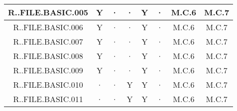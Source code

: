 \begin{table}[htbp]
\begin{tabular}{|c|c|c|c|c|c||c|c|}
    R..FILE.BASIC.005 & Y  &·  & · &Y  &· &M.C.6 & M.C.7\\
    \hline
    R..FILE.BASIC.006 & Y  &·  & · & Y  &· &M.C.6 & M.C.7\\ 
    \hline
    R..FILE.BASIC.007 & Y  &·  & · & Y  &· &M.C.6 & M.C.7\\
    \hline
    R..FILE.BASIC.008 & Y  &·  & · & Y  &· &M.C.6 & M.C.7\\
    \hline
    R..FILE.BASIC.009 & Y  &·  & · & Y  &· &M.C.6 & M.C.7\\ 
    \hline
    R..FILE.BASIC.010 &·  & · & Y & Y  &· &M.C.6 & M.C.7\\ 
    \hline
    R..FILE.BASIC.011 &·  & · & Y & Y  &· &M.C.6 & M.C.7\\ 
    \hline
\end{tabular}
\end{table}

